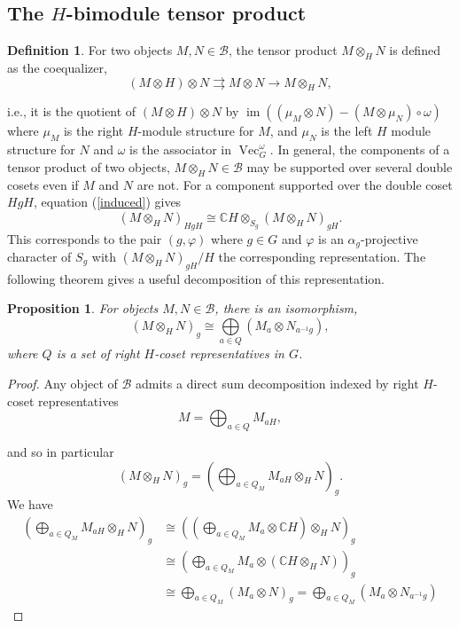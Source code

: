 \documentclass[a4paper, 10pt]{book}
\newtheorem{Prop}[theorem]{Proposition}
\theoremstyle{definition}
\newtheorem{Def}[theorem]{Definition}
\numberwithin{equation}{chapter}
\newcommand\inv{^{-1}}
\newcommand\ot{\otimes}
\newcommand\Vect{\operatorname{Vec}}
\newcommand\Img{\operatorname{im}}
\newcommand\CC{\mathbb C}
\newcommand\B{\mathcal B}
\begin{document}
\subsection{The $H$-bimodule tensor product} 
\begin{Def}
For two objects $M, N\in \B$, the tensor product $M\otimes_H N$  is defined as the coequalizer, \begin{equation*}
	(M\otimes H) \otimes N  \rightrightarrows M\otimes N \rightarrow M\otimes_H N,
\end{equation*}
\end{Def}
i.e., it is the quotient of $(M\otimes H)\otimes N$ by $\Img((\mu_M \otimes N)- (M\otimes \mu_N)\circ\omega)$ where $\mu_M$ is the right $H$-module structure for $M$, and $\mu_N$ is the left $H$ module structure for $N$ and $\omega$ is the associator in $\Vect^\omega_G$. In general, the components of a tensor product of two objects, $M\otimes_H N\in \B$ may be supported over several double cosets even if $M$ and $N$ are not. For a component supported over the double coset $HgH$, equation (\ref{induced}) gives
\begin{equation}\label{tensor}
	(M\otimes_H N)_{HgH} \cong \CC H \otimes_{S_g} (M\otimes_H N)_{gH}.
\end{equation}
This corresponds to the pair $(g, \varphi)$ where $g\in G$ and $\varphi$ is an $\alpha_g$-projective character of $S_g$ with $(M\otimes_H N)_{gH}/H$ the corresponding representation. The following theorem gives a useful decomposition of this representation. \begin{Prop}\label{decompprop}
For  objects $M,N \in \B$, there is an isomorphism, \begin{equation}
 (M\otimes_H N)_g \cong \underset{a\in Q}\bigoplus (M_a \otimes N_{a\inv g}),\label{decomp}
\end{equation}
where $Q$ is a set of right $H$-coset representatives in $G$.
\end{Prop}
\begin{proof}
Any object of $\B$ admits a direct sum decomposition indexed by right $H$-coset representatives \begin{equation*}
	M=\bigoplus_{a\in Q} M_{aH},
\end{equation*} 

and so in particular
\begin{equation*}
	(M\ot_H N)_g= (\bigoplus_{a\in Q_M} M_{aH}\otimes_H N)_g.
\end{equation*}
We have
\begin{align}
(\bigoplus_{a\in Q_M} M_{aH}\otimes_H N)_g
&\cong((\bigoplus_{a\in Q_M} M_a \otimes \CC H) \otimes_H N)_g\label{id1}
\\&\cong(\bigoplus_{a\in Q_M} M_a \otimes (\CC H \otimes_H N))_g\label{id2}\\
 &\cong \bigoplus_{a\in Q_M}( M_a \otimes N)_g
= \bigoplus_{a\in Q_M}( M_a \otimes N_{a\inv g})\label{bimodproductlast} \end{align} \end{proof} 
\end{document}
